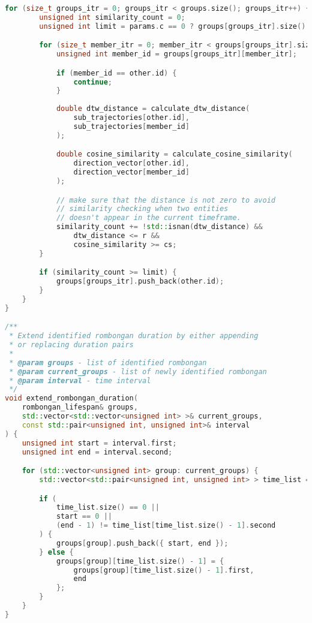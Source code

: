 \begin{lstlisting}[language=C++, caption=Implementasi modul \texttt{rombongan.cpp}, label={lamp:module-rombongan}]
    for (size_t groups_itr = 0; groups_itr < groups.size(); groups_itr++) {
        unsigned int similarity_count = 0;
        unsigned int limit = params.c == 0 ? groups[groups_itr].size() : params.c;

        for (size_t member_itr = 0; member_itr < groups[groups_itr].size() && similarity_count < limit; member_itr++) {
            unsigned int member_id = groups[groups_itr][member_itr];

            if (member_id == other.id) {
                continue;
            }
        
            double dtw_distance = calculate_dtw_distance(
                sub_trajectories[other.id],
                sub_trajectories[member_id]
            );

            double cosine_similarity = calculate_cosine_similarity(
                direction_vector[other.id],
                direction_vector[member_id]
            );

            // make sure that the distance is not zero to avoid
            // similarity checking when two entities
            // doesn't appear in the current timeframe.
            similarity_count += !std::isnan(dtw_distance) &&
                dtw_distance <= r &&
                cosine_similarity >= cs;
        }

        if (similarity_count >= limit) {
            groups[groups_itr].push_back(other.id);
        }
    }
}

/**
 * Extend identified rombongan duration by either appending
 * or replacing duration pairs
 * 
 * @param groups - list of identified rombongan
 * @param current_groups - list of newly identified rombongan
 * @param interval - time interval
 */
void extend_rombongan_duration(
    rombongan_lifespan& groups,
    std::vector<std::vector<unsigned int> >& current_groups,
    const std::pair<unsigned int, unsigned int>& interval
) {
    unsigned int start = interval.first;
    unsigned int end = interval.second;

    for (std::vector<unsigned int> group: current_groups) {
        std::vector<std::pair<unsigned int, unsigned int> > time_list = groups[group];

        if (
            time_list.size() == 0 ||
            start == 0 ||
            (end - 1) != time_list[time_list.size() - 1].second
        ) {
            groups[group].push_back({ start, end });
        } else {
            groups[group][time_list.size() - 1] = { 
                groups[group][time_list.size() - 1].first,
                end
            };
        }
    }
}


\end{lstlisting}
